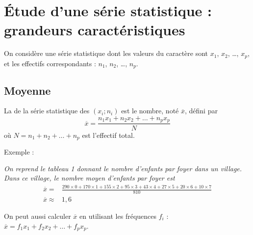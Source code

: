 \clearpage



\renewcommand{\exe}[1]{\par %
  \noindent%
  \fontfamily{cmss}\selectfont Exemple : \  \normalfont%
  \begin{minipage}[t]{0.85\linewidth}%
    \textit{#1}%
  \end{minipage} \par%
  \medskip
}

\section{Étude d'une série statistique : grandeurs caractéristiques}

On considère une série statistique dont les valeurs du caractère sont
$x_1$, $x_2$, {\ldots}, $x_p$, et les effectifs correspondants :
$n_1$, $n_2$, {\ldots}, $n_p$.



\subsection{Moyenne}

\begin{definition}
    La  de la série statistique des $(x_i;n_i)$ est le
  nombre, noté $\overline{x}$, défini par
  \[
  \overline{x} =
  \frac{n_1x_1+n_2x_2+{\ldots}+n_px_p}{N} 
  \]
  où $N = n_1+n_2+{\ldots}+n_p$ est l'effectif total.

    
\end{definition}

\bigskip


\exe{On reprend le tableau 1 donnant le nombre d'enfants par foyer
  dans un village. Dans ce village, le nombre moyen d'enfants par
  foyer est  
\begin{align*}
  \overline{x} = {} & 
  \frac{290\times0+170\times1+155\times2+95\times
    3+43\times 4+27\times 5+20\times 6+10\times 7}{810}
  \\[1ex]
  \overline{x} \approx {} & 1,6
\end{align*}
}
\medskip

\begin{remark}
On peut aussi calculer $\overline{x}$ en utilisant les fréquences
  $f_i$ : \\[1ex]
  $ \overline{x} = f_1 x_1 + f_2x_2+{\ldots}+f_px_p $. 

    
\end{remark}

